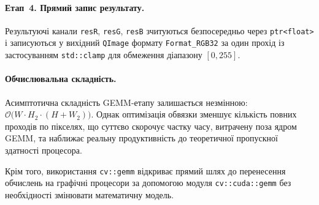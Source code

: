 \paragraph{Етап~4. Прямий запис результату.}
Результуючі канали \texttt{resR}, \texttt{resG}, \texttt{resB}
зчитуються безпосередньо через \texttt{ptr<float>} і записуються у
вихідний \texttt{QImage} формату \texttt{Format\_RGB32} за один прохід
із застосуванням \texttt{std::clamp} для обмеження діапазону $[0, 255]$.

\paragraph{Обчислювальна складність.}
Асимптотична складність GEMM-етапу залишається незмінною:
$\mathcal{O}\bigl(W \cdot H_2 \cdot (H + W_2)\bigr)$. Однак оптимізація
обвязки зменшує кількість повних проходів по пікселях, що суттєво скорочує частку часу, витрачену
поза ядром GEMM, та наближає реальну продуктивність до теоретичної
пропускної здатності процесора.

Крім того, використання \texttt{cv::gemm} відкриває прямий шлях до
перенесення обчислень на графічні процесори за допомогою модуля
\texttt{cv::cuda::gemm} без необхідності змінювати математичну модель.